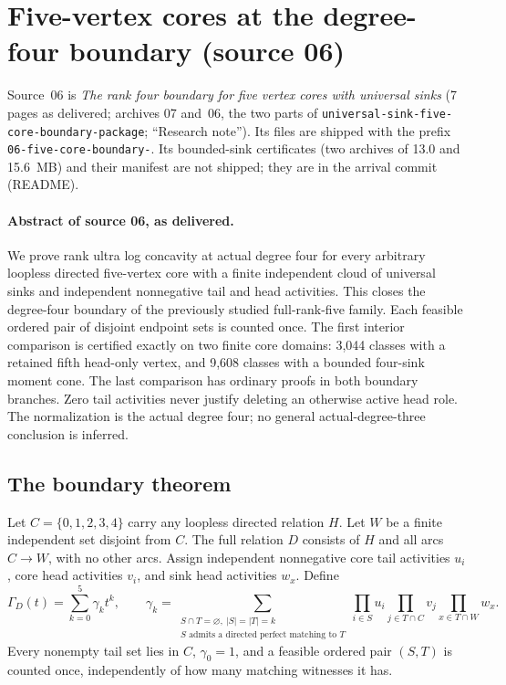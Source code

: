 \documentclass[11pt]{article}
\numberwithin{equation}{section}
\theoremstyle{definition}\newtheorem{definition}[theorem]{Definition}\newtheorem{remark}[theorem]{Remark}
\begin{document}
\section{Five-vertex cores at the degree-four boundary (source 06)}\label{pgr:s:fb:sec}

Source~06 is \emph{The rank four boundary for five vertex cores with
universal sinks} (7 pages as delivered; archives 07 and~06, the two parts
of \texttt{universal-sink-five-core-boundary-package}; ``Research note'').
Its files are shipped with the prefix \texttt{06-five-core-boundary-}. Its
bounded-sink certificates (two archives of 13.0 and 15.6~MB) and their
manifest are not shipped; they are in the arrival commit (README).

\paragraph{Abstract of source 06, as delivered.}

We prove rank ultra log concavity at actual degree four for every arbitrary loopless directed five-vertex core with a finite independent cloud of universal sinks and independent nonnegative tail and head activities. This closes the degree-four boundary of the previously studied full-rank-five family. Each feasible ordered pair of disjoint endpoint sets is counted once. The first interior comparison is certified exactly on two finite core domains: 3,044 classes with a retained fifth head-only vertex, and 9,608 classes with a bounded four-sink moment cone. The last comparison has ordinary proofs in both boundary branches. Zero tail activities never justify deleting an otherwise active head role. The normalization is the actual degree four; no general actual-degree-three conclusion is inferred.

\subsection{The boundary theorem}
Let $C=\{0,1,2,3,4\}$ carry any loopless directed relation $H$. Let $W$ be a finite independent set disjoint from $C$. The full relation $D$ consists of $H$ and all arcs $C\to W$, with no other arcs. Assign independent nonnegative core tail activities $u_i$, core head activities $v_i$, and sink head activities $w_x$. Define
\[
 \Gamma_D(t)=\sum_{k=0}^5\gamma_k t^k,\qquad
 \gamma_k=\sum_{\substack{S\cap T=\varnothing,\ |S|=|T|=k\\
 S\text{ admits a directed perfect matching to }T}}
 \prod_{i\in S}u_i\prod_{j\in T\cap C}v_j\prod_{x\in T\cap W}w_x.
\]
Every nonempty tail set lies in $C$, $\gamma_0=1$, and a feasible ordered pair $(S,T)$ is counted once, independently of how many matching witnesses it has.
\end{document}
